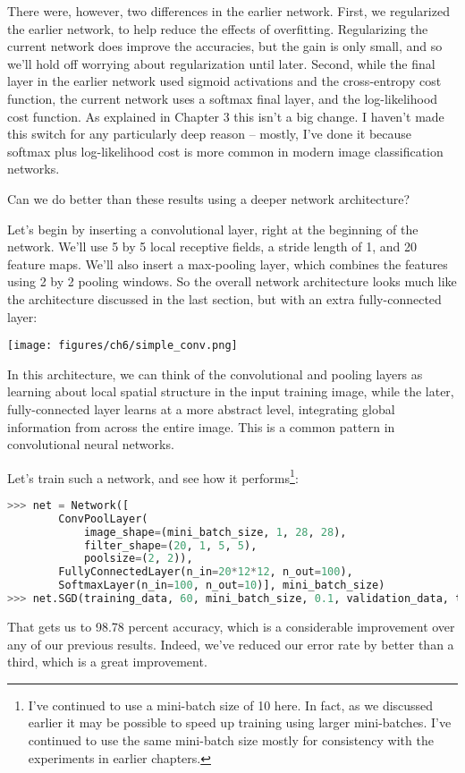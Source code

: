 \documentclass[a4paper,twoside,10pt]{book}
\begin{document}
There were, however, two differences in the earlier network. First, we regularized the earlier network, to help reduce the effects of overfitting. Regularizing the current network does improve the accuracies, but the gain is only small, and so we'll hold off worrying about regularization until later. Second, while the final layer in the earlier network used sigmoid activations and the cross-entropy cost function, the current network uses a softmax final layer, and the log-likelihood cost function. As explained in Chapter 3 this isn't a big change. I haven't made this switch for any particularly deep reason -- mostly, I've done it because softmax plus log-likelihood cost is more common in modern image classification networks.

Can we do better than these results using a deeper network architecture?

Let's begin by inserting a convolutional layer, right at the beginning of the network. We'll use 5 by 5 local receptive fields, a stride length of 1, and 20 feature maps. We'll also insert a max-pooling layer, which combines the features using 2 by 2 pooling windows. So the overall network architecture looks much like the architecture discussed in the last section, but with an extra fully-connected layer:
\begin{center}
	\texttt{[image: figures/ch6/simple\_conv.png]}
\end{center}
In this architecture, we can think of the convolutional and pooling layers as learning about local spatial structure in the input training image, while the later, fully-connected layer learns at a more abstract level, integrating global information from across the entire image. This is a common pattern in convolutional neural networks.

Let's train such a network, and see how it performs\footnote{I've continued to use a mini-batch size of 10 here. In fact, as we discussed earlier it may be possible to speed up training using larger mini-batches. I've continued to use the same mini-batch size mostly for consistency with the experiments in earlier chapters.}:
\begin{lstlisting}[language=Python]
>>> net = Network([
		ConvPoolLayer(
			image_shape=(mini_batch_size, 1, 28, 28), 
			filter_shape=(20, 1, 5, 5), 
			poolsize=(2, 2)),
		FullyConnectedLayer(n_in=20*12*12, n_out=100),
		SoftmaxLayer(n_in=100, n_out=10)], mini_batch_size)
>>> net.SGD(training_data, 60, mini_batch_size, 0.1, validation_data, test_data)   
\end{lstlisting}
That gets us to 98.78 percent accuracy, which is a considerable improvement over any of our previous results. Indeed, we've reduced our error rate by better than a third, which is a great improvement.
\end{document}

